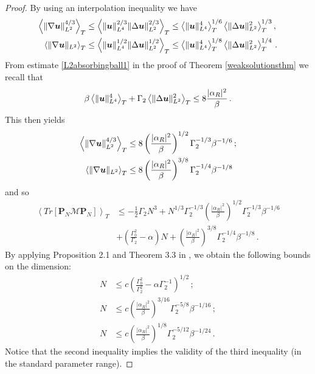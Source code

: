 \documentclass[11pt]{amsart}
\newcommand{\bu}{\mbox{\boldmath$u$}}
\newcommand{\Rb}{\beta}
\newcommand{\Gamzero}{\Gamma_{0}}
\newcommand{\Gamtwo}{\Gamma_{2}}
\theoremstyle{definition}
\numberwithin{equation}{section}
\numberwithin{equation}{section}
\begin{document}
\begin{proof}
By using an interpolation inequality we have
\begin{align}\label{GNI1}
\left\langle \lVert \nabla \bu \rVert_{L^2}^{4/3} \right\rangle_T &\leq \left\langle \lVert \bu \rVert_{L^4}^{2/3} \lVert \Delta \bu \rVert_{L^2}^{2/3} \right\rangle_T \leq \left\langle \lVert \bu \rVert_{L^4}^4 \right\rangle_T^{1/6} \left\langle \lVert \Delta \bu \rVert_{L^2}^2 \right\rangle_T^{1/3}, \\
\left\langle \lVert \nabla \bu \rVert_{L^2} \right\rangle_{T} &\leq \left\langle \lVert \bu \rVert_{L^4}^{1/2} \lVert \Delta \bu \rVert_{L^2}^{1/2} \right\rangle_T \leq \left\langle \lVert \bu \rVert_{L^4}^4 \right\rangle_T^{1/8} \left\langle \lVert \Delta \bu \rVert_{L^2}^2 \right\rangle_T^{1/4}\,.
\end{align}
From estimate \eqref{L2absorbingball1} in the proof of Theorem \ref{weaksolutionsthm} we recall that
\begin{equation*}
\Rb \left\langle \lVert \bu \rVert_{L^4}^4 \right\rangle_T + \Gamtwo \left\langle \lVert \Delta \bu \rVert_{L^2}^2 \right\rangle_T \leq 8 \frac{|\alpha_{R}|^2}{\Rb}\,.
\end{equation*}
This then yields 
\begin{align*}
\left\langle \lVert \nabla \bu \rVert_{L^2}^{4/3} \right\rangle_T &\leq 8 \left(\frac{|\alpha_{R}|^2}{\Rb}\right)^{1/2}\Gamtwo^{-1/3}\Rb^{-1/6}\,; \\
\left\langle \lVert \nabla \bu \rVert_{L^2} \right\rangle_T &\leq 8 \left(\frac{|\alpha_{R}|^2}{\Rb}\right)^{3/8} \Gamtwo^{-1/4} \Rb^{-1/8}
\end{align*}
and so 
\begin{align*}
\left<Tr \left[ \mathbf{P}_{N}\mathcal{M}\mathbf{P}_{N}\right] \right>_{T} &\leq - \frac{1}{2}\Gamtwo N^3 + 
N^{1/3}\Gamtwo^{-1/3}\left(\frac{|\alpha_{R}|^2}{\Rb}\right)^{1/2}\Gamtwo^{-1/3}\Rb^{-1/6}\\
&+ \left( \frac{\Gamzero^2}{\Gamtwo} - \alpha \right) N + \left(\frac{|\alpha_{R}|^2}{\Rb}\right)^{3/8} \Gamtwo^{-1/4} \Rb^{-1/8} \,.
\end{align*}
By applying Proposition 2.1 and Theorem 3.3 in \cite[Chapter 5]{temam1997}, we obtain the following bounds on the dimension:
\begin{align}
N &\leq c \left(\frac{\Gamzero^2}{\Gamtwo^2} - \alpha \Gamtwo^{-1}\right)^{1/2}\,; \\
N &\leq c \left(\frac{|\alpha_{R}|^2}{\Rb}\right)^{3/16}\Gamtwo^{-5/8}\Rb^{-1/16}\,; \\
N &\leq c \left(\frac{|\alpha_{R}|^2}{\Rb}\right)^{1/8} \Gamtwo^{-5/12} \Rb^{-1/24}\,.
\end{align}
Notice that the second inequality implies the validity of the third inequality (in the standard parameter range).
\end{proof}
\end{document}
